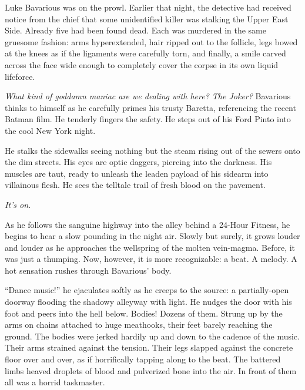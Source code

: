 Luke Bavarious was on the prowl. Earlier that night, the detective
had received notice from the chief that some unidentified killer
was stalking the Upper East Side. Already five had been found dead.
Each was murdered in the same gruesome fashion: arms hyperextended,
hair ripped out to the follicle, legs bowed at the knees as if the
ligaments were carefully torn, and finally, a smile carved across
the face wide enough to completely cover the corpse in its own
liquid lifeforce.



{\em What kind of goddamn maniac are we dealing with here? The
Joker?} Bavarious thinks to himself as he carefully primes his
trusty Baretta, referencing the recent Batman film. He tenderly
fingers the safety. He steps out of his Ford Pinto into the cool
New York night.



He stalks the sidewalks seeing nothing but the steam rising out of
the sewers onto the dim streets. His eyes are optic daggers,
piercing into the darkness. His muscles are taut, ready to unleash
the leaden payload of his sidearm into villainous flesh. He sees
the telltale trail of fresh blood on the pavement.



{\em It's on.}



As he follows the sanguine highway into the alley behind a 24-Hour
Fitness, he begins to hear a slow pounding in the night air. Slowly
but surely, it grows louder and louder as he approaches the
wellspring of the molten vein-magma. Before, it was just a
thumping. Now, however, it is more recognizable: a beat. A melody.
A hot sensation rushes through Bavarious' body.



``Dance music!'' he ejaculates softly as he creeps to the
source: a partially-open doorway flooding the shadowy alleyway with
light. He nudges the door with his foot and peers into the hell
below. Bodies! Dozens of them. Strung up by the arms on chains
attached to huge meathooks, their feet barely reaching the ground.
The bodies were jerked hardily up and down to the cadence of the
music. Their arms strained against the tension. Their legs slapped
against the concrete floor over and over, as if horrifically
tapping along to the beat. The battered limbs heaved droplets of
blood and pulverized bone into the air. In front of them all was a
horrid taskmaster.



